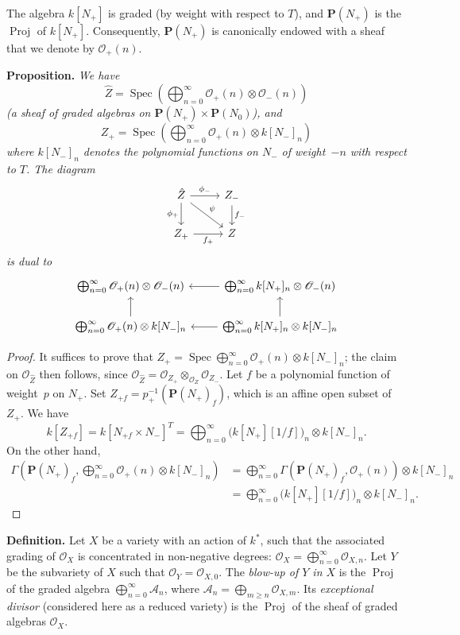 \documentclass{article}
\newenvironment{itenv}[1]
  {\phantomsection\par\medskip\noindent\textbf{#1.}\itshape}
  {\par\medskip}
\newenvironment{rmenv}[1]
  {\phantomsection\par\medskip\noindent\textbf{#1.}\rmfamily}
  {\par\medskip}
\newcommand{\scr}[1]{{\mathscr{#1}}}
\newcommand{\PP}{\mathbf{P}}
\DeclareMathOperator{\Spec}{Spec}
\DeclareMathOperator{\Proj}{Proj}
\renewcommand{\geq}{\geqslant}
\newcommand{\oldpage}[1]{\marginpar{\footnotesize$\Big\vert$ \textit{p.~#1}}}
\begin{document}
The algebra $k[N_+]$ is graded (by weight with respect to $T$), and $\PP(N_+)$ is the $\Proj$ of $k[N_+]$.
Consequently, $\PP(N_+)$ is canonically endowed with a sheaf that we denote by $\scr{O}_+(n)$.

\begin{itenv}{Proposition}
  We have
  \[
    \hat{Z} = \Spec \left( \bigoplus_{n=0}^\infty \scr{O}_+(n)\otimes\scr{O}_-(n) \right)
  \]
  (a sheaf of graded algebras on $\PP(N_+)\times\PP(N_0)$), and
  \[
    Z_+ = \Spec \left( \bigoplus_{n=0}^\infty \scr{O}_+(n)\otimes k[N_-]_n \right)
  \]
  where $k[N_-]_n$ denotes the polynomial functions on $N_-$ of weight~$-n$ with respect to $T$.
  The diagram
  \[
    \begin{tikzcd}
      \hat{Z} \rar["\phi_-"] \dar[swap,"\phi_+"] \drar["\psi"]
      & Z_- \dar["f_-"]
    \\Z_+ \rar[swap,"f_+"]
      & Z
    \end{tikzcd}
  \]
\oldpage{519}
  is dual to
  \[
    \begin{tikzcd}
      \bigoplus_{n=0}^\infty\scr{O}_+(n)\otimes\scr{O}_-(n)
      & \bigoplus_{n=0}^\infty k[N_+]_n\otimes\scr{O}_-(n) \lar
    \\\bigoplus_{n=0}^\infty\scr{O}_+(n)\otimes k[N_-]_n \uar
      & \bigoplus_{n=0}^\infty k[N_+]_n\otimes k[N_-]_n \uar \lar
    \end{tikzcd}
  \]
\end{itenv}

\begin{proof}
  It suffices to prove that $Z_+=\Spec\bigoplus_{n=0}^\infty\scr{O}_+(n)\otimes k[N_-]_n$;
  the claim on $\scr{O}_{\hat{Z}}$ then follows, since $\scr{O}_{\hat{Z}}=\scr{O}_{Z_+}\otimes_{\scr{O}_Z}\scr{O}_{Z_-}$.
  Let $f$ be a polynomial function of weight~$p$ on $N_+$.
  Set $Z_{+f}=p_+^{-1}(\PP(N_+)_f)$, which is an affine open subset of $Z_+$.
  We have
  \[
    k[Z_{+f}]
    = k[N_{+f}\times N_-]^T
    = \bigoplus_{n=0}^\infty\big(k[N_+][1/f]\big)_n\otimes k[N_-]_n.
  \]
  On the other hand,
  \[
    \begin{aligned}
      \Gamma\left(\PP(N_+)_f, \bigoplus_{n=0}^\infty\scr{O}_+(n)\otimes k[N_-]_n\right)
      &= \bigoplus_{n=0}^\infty\Gamma\left(\PP(N_+)_f,\scr{O}_+(n)\right)\otimes k[N_-]_n
    \\&= \bigoplus_{n=0}^\infty\big(k[N_+][1/f]\big)_n\otimes k[N_-]_n.
    \end{aligned}
  \]
\end{proof}

\begin{rmenv}{Definition}
  Let $X$ be a variety with an action of $k^*$, such that the associated grading of $\scr{O}_X$ is concentrated in non-negative degrees: $\scr{O}_X=\bigoplus_{n=0}^\infty\scr{O}_{X,n}$.
  Let $Y$ be the subvariety of $X$ such that $\scr{O}_Y=\scr{O}_{X,0}$.
  The \emph{blow-up of $Y$ in $X$} is the $\Proj$ of the graded algebra $\bigoplus_{n=0}^\infty\mathcal{A}_n$, where $\mathcal{A}_n=\bigoplus_{m\geq n}\scr{O}_{X,m}$.
  Its \emph{exceptional divisor} (considered here as a reduced variety) is the $\Proj$ of the sheaf of graded algebras $\scr{O}_X$.
\end{rmenv}
\end{document}
